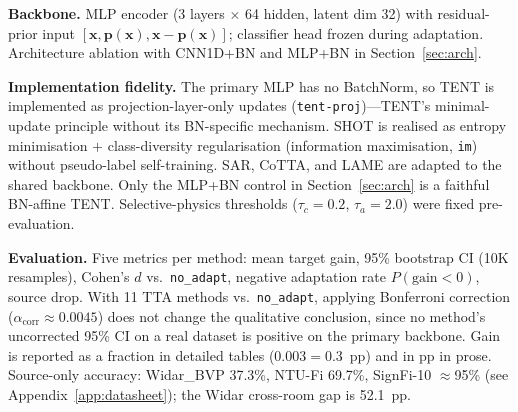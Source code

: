 \textbf{Backbone.} MLP encoder (3 layers $\times$ 64 hidden, latent dim 32) with residual-prior input $[\mathbf{x},\mathbf{p}(\mathbf{x}),\mathbf{x}-\mathbf{p}(\mathbf{x})]$; classifier head frozen during adaptation. Architecture ablation with CNN1D+BN and MLP+BN in Section~\ref{sec:arch}.

\textbf{Implementation fidelity.} The primary MLP has no BatchNorm, so TENT is implemented as projection-layer-only updates (\texttt{tent-proj})---TENT's minimal-update principle without its BN-specific mechanism. SHOT is realised as entropy minimisation $+$ class-diversity regularisation (information maximisation, \texttt{im}) without pseudo-label self-training. SAR, CoTTA, and LAME are adapted to the shared backbone. Only the MLP+BN control in Section~\ref{sec:arch} is a faithful BN-affine TENT. Selective-physics thresholds ($\tau_c{=}0.2$, $\tau_a{=}2.0$) were fixed pre-evaluation.

\textbf{Evaluation.} Five metrics per method: mean target gain, 95\% bootstrap CI (10K resamples), Cohen's $d$ vs.\ \texttt{no\_adapt}, negative adaptation rate $P(\text{gain}<0)$, source drop. With 11 TTA methods vs.\ \texttt{no\_adapt}, applying Bonferroni correction ($\alpha_{\text{corr}}\approx0.0045$) does not change the qualitative conclusion, since no method's uncorrected 95\% CI on a real dataset is positive on the primary backbone. Gain is reported as a fraction in detailed tables ($0.003{=}0.3$~pp) and in pp in prose. Source-only accuracy: Widar\_BVP 37.3\%, NTU-Fi 69.7\%, SignFi-10 $\approx$95\% (see Appendix~\ref{app:datasheet}); the Widar cross-room gap is 52.1~pp.

